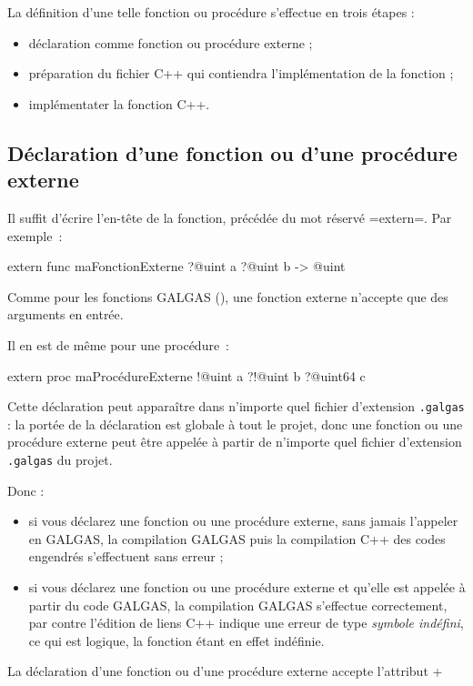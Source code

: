 La définition d'une telle fonction ou procédure s'effectue en trois étapes :
\begin{itemize}
  \item déclaration comme fonction ou procédure externe ;
  \item préparation du fichier C++ qui contiendra l'implémentation de la fonction ;
  \item implémentater la fonction C++.
\end{itemize}

\subsection{Déclaration d'une fonction ou d'une procédure externe}

Il suffit d'écrire l'en-tête de la fonction, précédée du mot réservé \ggs=extern=. Par exemple~:
\begin{galgas}
extern func maFonctionExterne ?@uint a ?@uint b -> @uint 
\end{galgas}

Comme pour les fonctions GALGAS (), une fonction externe n'accepte que des arguments en entrée.

Il en est de même pour une procédure~:
\begin{galgas}
extern proc maProcédureExterne !@uint a ?!@uint b ?@uint64 c
\end{galgas}

Cette déclaration peut apparaître dans n'importe quel fichier d'extension \texttt{.galgas} : la portée de la déclaration est globale à tout le projet, donc une fonction ou une procédure externe peut être appelée à partir de n'importe quel fichier d'extension \texttt{.galgas} du projet.

Donc : 
\begin{itemize}
  \item si vous déclarez une fonction ou une procédure externe, sans jamais l'appeler en GALGAS, la compilation GALGAS puis la compilation C++ des codes engendrés s'effectuent sans erreur ;
  \item si vous déclarez  une fonction ou une procédure externe et qu'elle est appelée à partir du code GALGAS, la compilation GALGAS s'effectue correctement, par contre l'édition de liens C++ indique une erreur de type \emph{symbole indéfini}, ce qui est logique, la fonction étant en effet indéfinie.
\end{itemize}


La déclaration d'une fonction ou d'une procédure externe accepte l'attribut \ggs+%

